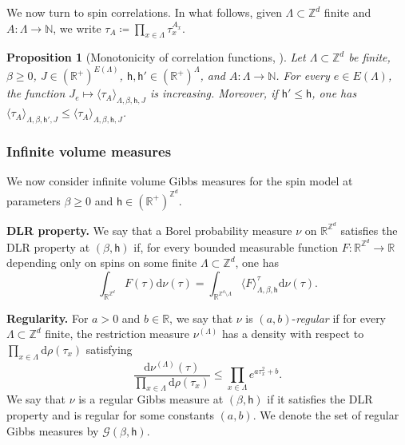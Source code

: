 \documentclass[11pt,a4paper]{article}
\numberwithin{equation}{section}
\theoremstyle{plain}
\newtheorem{Prop}[Thm]{Proposition}
\theoremstyle{definition}
\begin{document}
We now turn to spin correlations. In what follows, given $\Lambda\subset\mathbb{Z}^d$ finite and $A:\Lambda\rightarrow \mathbb{N}$, we write $\tau_A\coloneqq \prod_{x\in \Lambda} \tau_x^{A_x}$.


\begin{Prop}[Monotonicity of correlation functions, {\cite[Proposition 3.20 and Remark 3.21]{GunaratnamPanagiotisPanisSeveroPhi42022}}] \label{prop:monotonicity}
Let $\Lambda \subset \mathbb Z^d$ be finite, $\beta\geq0$, $J\in (\mathbb R^+)^{E(\Lambda)}$, $\mathsf{h},\mathsf{h}'\in (\mathbb R^+)^\Lambda$, and $A: \Lambda\to \mathbb{N}$. For every $e\in E(\Lambda)$, the function
$J_e\mapsto \langle \tau_A\rangle_{\Lambda,\beta,\mathsf{h},J}$ is increasing. Moreover, if $\mathsf{h}'\leq \mathsf{h}$, one has $\langle \tau_A\rangle_{\Lambda,\beta,\mathsf{h}',J}\leq \langle \tau_A\rangle_{\Lambda,\beta,\mathsf{h},J}$.
\end{Prop}





\subsubsection{Infinite volume measures}

We now consider infinite volume Gibbs measures for the spin model at parameters $\beta\geq 0$ and $\mathsf{h}\in(\mathbb R^+)^{\mathbb Z^d}$.

\hfill

\noindent\textbf{DLR property.} We say that a Borel probability measure $\nu$ on $\mathbb R^{\mathbb Z^d}$ satisfies the DLR property at $(\beta,\mathsf{h})$ if, for every bounded measurable function $F: \mathbb R^{\mathbb Z^d} \rightarrow \mathbb R$ depending only on spins on some finite $\Lambda \subset \mathbb Z^d$, one has
\begin{equation}\label{eq:DLR}
\int_{\mathbb R^{\mathbb Z^d}} F(\tau) \mathrm{d}\nu(\tau) = \int_{\mathbb R^{\mathbb Z^d \setminus \Lambda}} \langle F \rangle_{\Lambda, \beta,\mathsf{h}}^{\tau}\mathrm{d}\nu(\tau).
\end{equation}

\hfill

\noindent\textbf{Regularity.} For $a>0$ and $b\in \mathbb R$, we say that $\nu$ is $(a,b)$-\emph{regular} if for every $\Lambda \subset \mathbb Z^d$ finite, the restriction measure $\nu^{(\Lambda)}$ has a density with respect to $\prod_{x \in \Lambda} \mathrm{d}\rho(\tau_x)$ satisfying
\begin{equation} \label{eqdef: regularity}
\frac{\mathrm{d}\nu^{(\Lambda)}(\tau)}{\prod_{x \in \Lambda} \mathrm{d}\rho(\tau_x)} \leq \prod_{x \in \Lambda} e^{a\tau_x^2+b} .
\end{equation}
We say that $\nu$ is a regular Gibbs measure at $(\beta,\mathsf{h})$ if it satisfies the DLR property and is regular for some constants $(a,b)$. We denote the set of regular Gibbs measures by $\mathcal G(\beta,\mathsf{h})$. 
\end{document}

